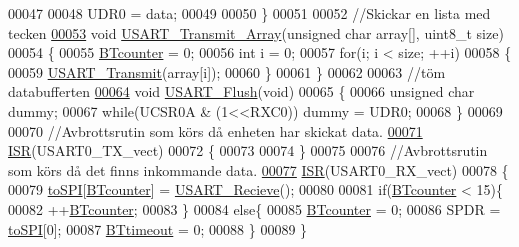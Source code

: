\begin{DoxyCode}
00047     
00048     UDR0 = data;
00049     
00050 \}
00051 
00052 \textcolor{comment}{//Skickar en lista med tecken}
\hypertarget{_u_s_a_r_t_8c_source.tex_l00053}{}\hyperlink{_u_s_a_r_t_8h_a03b0ffa896b87d880101195bf1377df9}{00053} \textcolor{keywordtype}{void} \hyperlink{_u_s_a_r_t_8c_a03b0ffa896b87d880101195bf1377df9}{USART\_Transmit\_Array}(\textcolor{keywordtype}{unsigned} \textcolor{keywordtype}{char} array[], uint8\_t size)
00054 \{
00055     \hyperlink{_u_s_a_r_t_8h_ad9497e6b45d71841b52db55c1ef891f6}{BTcounter} = 0;
00056     \textcolor{keywordtype}{int} i = 0;
00057     \textcolor{keywordflow}{for}(i; i < size; ++i)
00058     \{
00059         \hyperlink{_u_s_a_r_t_8c_ab8c416106cf1aff4ccdb3da4860fc179}{USART\_Transmit}(array[i]);
00060     \}
00061 \}
00062 
00063 \textcolor{comment}{//töm databufferten}
\hypertarget{_u_s_a_r_t_8c_source.tex_l00064}{}\hyperlink{_u_s_a_r_t_8h_a0f33ec0995bf5f267e847d9e22fb596a}{00064} \textcolor{keywordtype}{void} \hyperlink{_u_s_a_r_t_8c_a0f33ec0995bf5f267e847d9e22fb596a}{USART\_Flush}(\textcolor{keywordtype}{void})
00065 \{
00066     \textcolor{keywordtype}{unsigned} \textcolor{keywordtype}{char} dummy;
00067     \textcolor{keywordflow}{while}(UCSR0A & (1<<RXC0)) dummy = UDR0;
00068 \}
00069 
00070 \textcolor{comment}{//Avbrottsrutin som körs då enheten har skickat data.}
\hypertarget{_u_s_a_r_t_8c_source.tex_l00071}{}\hyperlink{_u_s_a_r_t_8c_a7cde100ac531d01c1dd3b434480a3601}{00071} \hyperlink{_u_s_a_r_t_8c_a7cde100ac531d01c1dd3b434480a3601}{ISR}(USART0\_TX\_vect)
00072 \{
00073     
00074 \}
00075 
00076 \textcolor{comment}{//Avbrottsrutin som körs då det finns inkommande data.}
\hypertarget{_u_s_a_r_t_8c_source.tex_l00077}{}\hyperlink{_u_s_a_r_t_8c_a084f0a9cf05b1877bd8a71a90dae7ff8}{00077} \hyperlink{_u_s_a_r_t_8c_a7cde100ac531d01c1dd3b434480a3601}{ISR}(USART0\_RX\_vect)
00078 \{
00079     \hyperlink{_buffers_8h_a3b60028d98e73923081cbf257a237731}{toSPI}[\hyperlink{_u_s_a_r_t_8h_ad9497e6b45d71841b52db55c1ef891f6}{BTcounter}] = \hyperlink{_u_s_a_r_t_8c_abdcbc8bf037debf49ff1c15614a59c50}{USART\_Recieve}();
00080     
00081     \textcolor{keywordflow}{if}(\hyperlink{_u_s_a_r_t_8h_ad9497e6b45d71841b52db55c1ef891f6}{BTcounter} < 15)\{
00082         ++\hyperlink{_u_s_a_r_t_8h_ad9497e6b45d71841b52db55c1ef891f6}{BTcounter};
00083     \}
00084     \textcolor{keywordflow}{else}\{
00085         \hyperlink{_u_s_a_r_t_8h_ad9497e6b45d71841b52db55c1ef891f6}{BTcounter} = 0;
00086         SPDR = \hyperlink{_buffers_8h_a3b60028d98e73923081cbf257a237731}{toSPI}[0];
00087         \hyperlink{_u_s_a_r_t_8h_ac73ad3c207657516f4f319adaf861a1b}{BTtimeout} = 0;
00088     \}
00089 \}
\end{DoxyCode}
